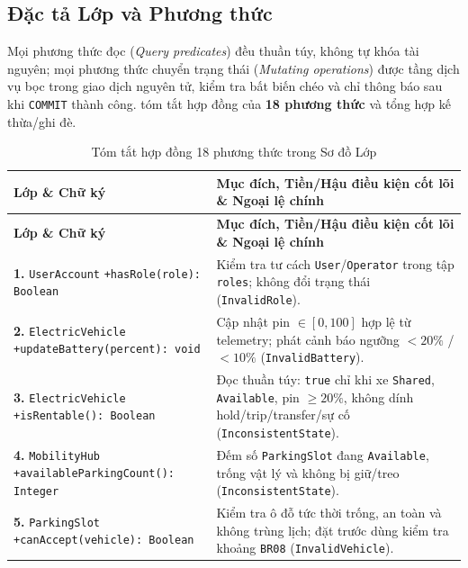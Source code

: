 \subsection{Đặc tả Lớp và Phương thức}

Mọi phương thức đọc (\textit{Query predicates}) đều thuần túy, không tự khóa tài nguyên; mọi phương thức chuyển trạng thái (\textit{Mutating operations}) được tầng dịch vụ bọc trong giao dịch nguyên tử, kiểm tra bất biến chéo và chỉ thông báo sau khi \texttt{COMMIT} thành công.  tóm tắt hợp đồng của \textbf{18 phương thức} và  tổng hợp kế thừa/ghi đè.

{\small
\begin{longtable}{>{\raggedright\arraybackslash}p{4.3cm} >{\raggedright\arraybackslash}p{10.0cm}}
\caption{Tóm tắt hợp đồng 18 phương thức trong Sơ đồ Lớp} \label{tab:method-contracts} \\
\toprule
\textbf{Lớp \& Chữ ký} & \textbf{Mục đích, Tiền/Hậu điều kiện cốt lõi \& Ngoại lệ chính} \\
\midrule
\endfirsthead
\toprule
\textbf{Lớp \& Chữ ký} & \textbf{Mục đích, Tiền/Hậu điều kiện cốt lõi \& Ngoại lệ chính} \\
\midrule
\endhead
\bottomrule
\endfoot
\textbf{1.} \texttt{UserAccount} \newline \texttt{+hasRole(role): Boolean} & Kiểm tra tư cách \texttt{User}/\texttt{Operator} trong tập \texttt{roles}; không đổi trạng thái (\texttt{InvalidRole}). \\
\textbf{2.} \texttt{ElectricVehicle} \newline \texttt{+updateBattery(percent): void} & Cập nhật pin $\in [0,100]$ hợp lệ từ telemetry; phát cảnh báo ngưỡng $<20\%$ / $<10\%$ (\texttt{InvalidBattery}). \\
\textbf{3.} \texttt{ElectricVehicle} \newline \texttt{+isRentable(): Boolean} & Đọc thuần túy: \texttt{true} chỉ khi xe \texttt{Shared}, \texttt{Available}, pin $\ge 20\%$, không dính hold/trip/transfer/sự cố (\texttt{InconsistentState}). \\
\textbf{4.} \texttt{MobilityHub} \newline \texttt{+availableParking\allowbreak Count(): Integer} & Đếm số \texttt{ParkingSlot} đang \texttt{Available}, trống vật lý và không bị giữ/treo (\texttt{InconsistentState}). \\
\textbf{5.} \texttt{ParkingSlot} \newline \texttt{+canAccept(vehicle): Boolean} & Kiểm tra ô đỗ tức thời trống, an toàn và không trùng lịch; đặt trước dùng kiểm tra khoảng \texttt{BR08} (\texttt{InvalidVehicle}). \\

\end{longtable}}
